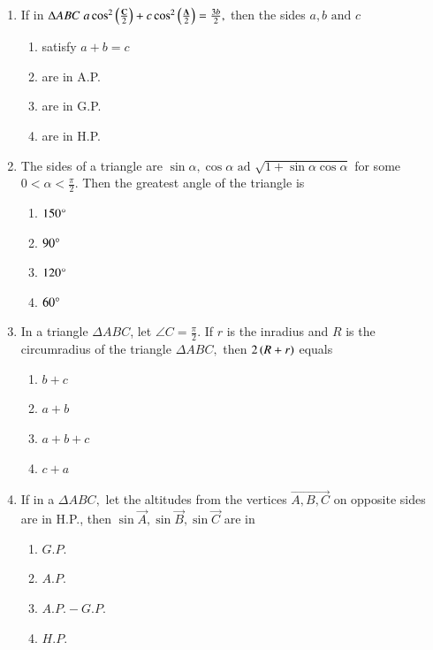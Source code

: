 \begin{enumerate}[label=\thesubsection.\arabic*,ref=\thesubsection.\theenumi]
\item If in $\Delta{ABC}\;a\cos^2\left(\frac{\mathbf{C}}{2}\right) + c\cos^2\left(\frac{\mathbf{A}}{2}\right) = \frac{3b}{2},$ then the sides $a,b\text{ and }c$ \hfill{}
\begin{multicols}{4}
\begin{enumerate}
        \item satisfy $a+b=c$                    
        \item are in A.P. 
        \item are in G.P. 
        \item are in H.P.
\end{enumerate}
\end{multicols} 

\item The sides of a triangle are $\sin\alpha,\cos\alpha \text{ ad } \sqrt{1+\sin\alpha\cos\alpha}$ for some $0<\alpha<\frac{\pi}{2}.$ Then the greatest angle of the triangle is \hfill{}
\begin{multicols}{4}
\begin{enumerate}
        \item $150\degree$                    
        \item $90\degree$ 
        \item $120\degree$
        \item $60\degree$
\end{enumerate}
\end{multicols} 

\item In a triangle $\Delta{ABC}$, let $\angle{C}=\frac{\pi}{2}.$ If $r$ is the inradius and $R$ is the circumradius of the triangle $\Delta{ABC},$ then $2\left(R+r\right)$ equals \hfill{}
\begin{multicols}{4}
\begin{enumerate}
        \item $b+c$                    
        \item $a+b$ 
        \item $a+b+c$ 
        \item $c+a$
\end{enumerate}
\end{multicols} 

\item If in a $\Delta ABC,$ let the altitudes from the vertices $\vec{A,B,C}$ on opposite sides are in H.P., then $\sin \vec{A},\sin \vec{B},\sin \vec{C}$ are in \hfill{}
\begin{multicols}{4}
\begin{enumerate}
        \item $G.P.$                    
        \item $A.P.$ 
        \item $A.P.-G.P.$ 
        \item $H.P.$
\end{enumerate}
\end{multicols} 




\end{enumerate}
